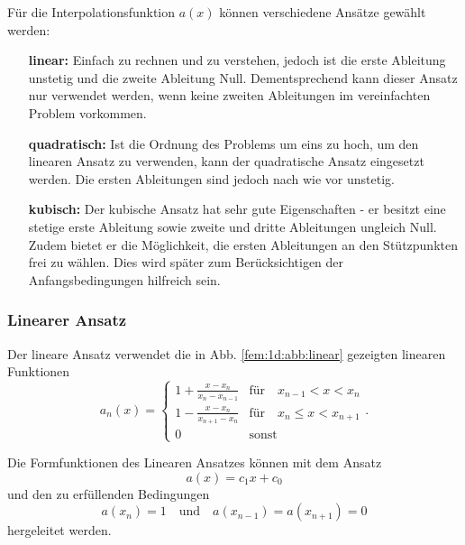 Für die Interpolationsfunktion $a(x)$ können verschiedene Ansätze gewählt werden:
\begin{itemize}
    \item[\textbf{linear:}] 
        Einfach zu rechnen und zu verstehen, jedoch ist die erste Ableitung unstetig und die zweite Ableitung Null.
        Dementsprechend kann dieser Ansatz nur verwendet werden, wenn keine zweiten Ableitungen im vereinfachten Problem vorkommen.
    \item[\textbf{quadratisch:}]
        Ist die Ordnung des Problems um eins zu hoch, um den linearen Ansatz zu verwenden, kann der quadratische Ansatz eingesetzt werden.
        Die ersten Ableitungen sind jedoch nach wie vor unstetig.
    \item[\textbf{kubisch:}]  
        Der kubische Ansatz hat sehr gute Eigenschaften - er besitzt eine stetige erste Ableitung sowie zweite und dritte Ableitungen ungleich Null. 
        Zudem bietet er die Möglichkeit, die ersten Ableitungen an den Stützpunkten frei zu wählen.
        Dies wird später zum Berücksichtigen der Anfangsbedingungen hilfreich sein.
\end{itemize}

\subsubsection{Linearer Ansatz}
Der lineare Ansatz verwendet die in Abb. \ref{fem:1d:abb:linear} gezeigten linearen Funktionen
\begin{equation}
    a_n(x) = \left\{ \begin{array}{ll}
        1+\frac{x-x_n}{x_n - x_{n-1}} 
            & \text{für} \quad x_{n-1} < x < x_n \\
        1-\frac{x-x_n}{x_{n+1} - x_n} 
            & \text{für} \quad x_n \leq x < x_{n+1} \\
        0
            & \text{sonst}
    \end{array} \right..
\end{equation}

Die Formfunktionen des Linearen Ansatzes können mit dem Ansatz 
\begin{equation}
    a(x) = c_1x + c_0
\end{equation}
und den zu erfüllenden Bedingungen
\begin{equation}
        a(x_n) = 1 
        \quad \text{und} \quad
        a(x_{n-1}) = a(x_{n+1}) = 0
\end{equation}
hergeleitet werden.

